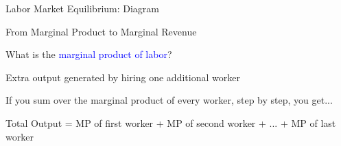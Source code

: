 \documentclass[notes,11pt, aspectratio=169, xcolor=table]{beamer}
\newcommand{\blue}[1]{\textcolor{blue}{#1}}
\newenvironment{wideitemize}{\itemize\addtolength{\itemsep}{10pt}}{\enditemize}
\begin{document}
\begin{frame}{Labor Market Equilibrium: Diagram}
\begin{figure}
\end{figure}

\end{frame}

\begin{frame}{From Marginal Product to Marginal Revenue}

\begin{wideitemize}
    \item What is the \blue{marginal product of labor}?
    \item<2-> Extra output generated by hiring one additional worker
    \item<3-> If you sum over the marginal product of every worker, step by step, you get...

    \begin{center}
        Total Output = MP of first worker + MP of second worker + ... + MP of last worker   
    \end{center}
    
\end{wideitemize}
    
\end{frame}
\end{document}
